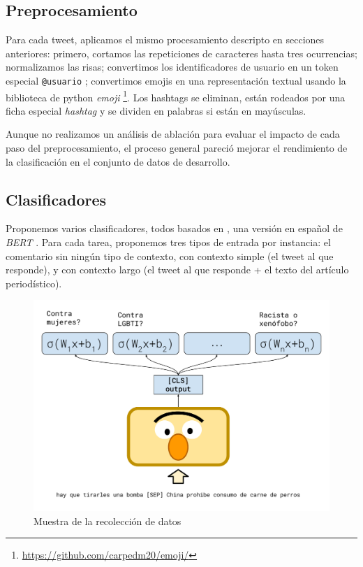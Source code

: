 \subsection{Preprocesamiento}

Para cada tweet, aplicamos el mismo procesamiento descripto en secciones anteriores: primero, cortamos las repeticiones de caracteres hasta tres ocurrencias; normalizamos las risas; convertimos los identificadores de usuario en un token especial \verb|@usuario| ; convertimos emojis en una representación textual usando la biblioteca de python \emph{emoji} \footnote {\url{https://github.com/carpedm20/emoji/}}. Los hashtags se eliminan, están rodeados por una ficha especial \emph{hashtag } y se dividen en palabras si están en mayúsculas.

Aunque no realizamos un análisis de ablación para evaluar el impacto de cada paso del preprocesamiento, el proceso general pareció mejorar el rendimiento de la clasificación en el conjunto de datos de desarrollo.

\subsection{Clasificadores}
\label{sec:contextualized_classifiers}




Proponemos varios clasificadores, todos basados en \beto{}\cite{canete2020spanish}, una versión en español de \emph{BERT} \cite{devlin2018bert}. Para cada tarea, proponemos tres tipos de entrada por instancia: el comentario sin ningún tipo de contexto, con contexto simple (el tweet al que responde), y con contexto largo (el tweet al que responde + el texto del artículo periodístico).



\begin{figure}
    \centering
    \includegraphics[width=\textwidth]{img/bert_multioutput.pdf}
    \caption{Muestra de la recolección de datos}
    \label{fig:bert_classifier}
\end{figure}

